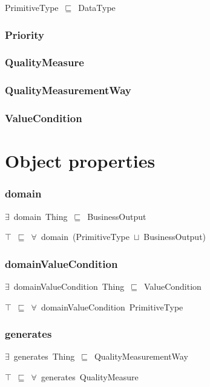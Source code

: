 \documentclass{article}
\begin{document}
PrimitiveType~\ensuremath{\sqsubseteq}~DataType~

\subsubsection*{Priority}

\subsubsection*{QualityMeasure}

\subsubsection*{QualityMeasurementWay}

\subsubsection*{ValueCondition}

\section*{Object properties}\subsubsection*{domain}

\ensuremath{\exists}~domain~Thing~\ensuremath{\sqsubseteq}~BusinessOutput

\ensuremath{\top}~\ensuremath{\sqsubseteq}~\ensuremath{\forall}~domain~(PrimitiveType~\ensuremath{\sqcup}~BusinessOutput)

\subsubsection*{domainValueCondition}

\ensuremath{\exists}~domainValueCondition~Thing~\ensuremath{\sqsubseteq}~ValueCondition

\ensuremath{\top}~\ensuremath{\sqsubseteq}~\ensuremath{\forall}~domainValueCondition~PrimitiveType

\subsubsection*{generates}

\ensuremath{\exists}~generates~Thing~\ensuremath{\sqsubseteq}~QualityMeasurementWay

\ensuremath{\top}~\ensuremath{\sqsubseteq}~\ensuremath{\forall}~generates~QualityMeasure
\end{document}
